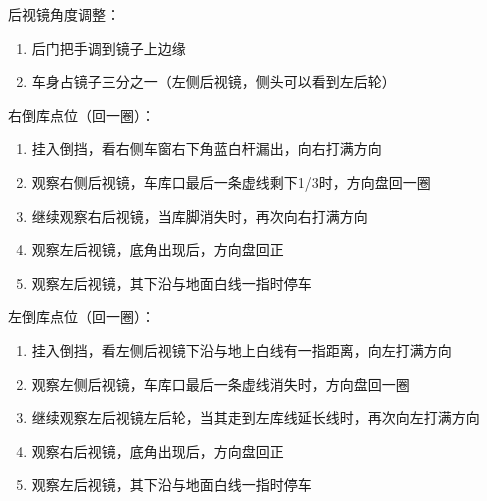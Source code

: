 \noindent
后视镜角度调整：

\begin{enumerate}
    \item 后门把手调到镜子上边缘
    \item 车身占镜子三分之一（左侧后视镜，侧头可以看到左后轮）
\end{enumerate}

\noindent
右倒库点位（回一圈）：

\begin{enumerate}
    \item 挂入倒挡，看右侧车窗右下角蓝白杆漏出，向右打满方向
    \item 观察右侧后视镜，车库口最后一条虚线剩下1/3时，方向盘回一圈
    \item 继续观察右后视镜，当库脚消失时，再次向右打满方向
    \item 观察左后视镜，底角出现后，方向盘回正
    \item 观察左后视镜，其下沿与地面白线一指时停车
\end{enumerate}

\noindent
左倒库点位（回一圈）：

\begin{enumerate}
    \item 挂入倒挡，看左侧后视镜下沿与地上白线有一指距离，向左打满方向
    \item 观察左侧后视镜，车库口最后一条虚线消失时，方向盘回一圈
    \item 继续观察左后视镜左后轮，当其走到左库线延长线时，再次向左打满方向
    \item 观察右后视镜，底角出现后，方向盘回正
    \item 观察左后视镜，其下沿与地面白线一指时停车
\end{enumerate}